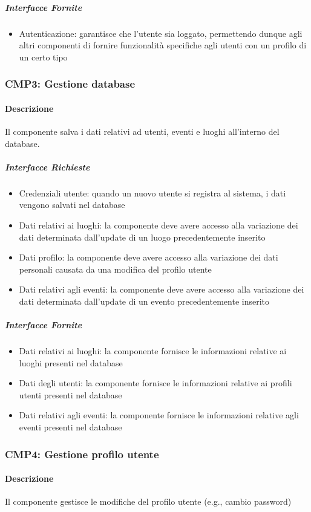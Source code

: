 \documentclass[9pt]{extarticle}
\begin{document}
\subparagraph{Interfacce Fornite}
\begin{itemize}
	\item Autenticazione: garantisce che l'utente sia loggato, permettendo dunque agli altri componenti di fornire funzionalità specifiche agli utenti con un profilo di un certo tipo
\end{itemize}

\subsubsection*{CMP3: Gestione database}
\paragraph{Descrizione}
Il componente salva i dati relativi ad utenti, eventi e luoghi all'interno del database.
\subparagraph{Interfacce Richieste}
\begin{itemize}
	\item Credenziali utente: quando un nuovo utente si registra al sistema, i dati vengono salvati nel database
	\item Dati relativi ai luoghi: la componente deve avere accesso alla variazione dei dati determinata dall'update di un luogo precedentemente inserito
	\item Dati profilo: la componente deve avere accesso alla variazione dei dati personali causata da una modifica del profilo utente
	\item Dati relativi agli eventi: la componente deve avere accesso alla variazione dei dati determinata dall'update di un evento precedentemente inserito
\end{itemize}
\subparagraph{Interfacce Fornite}
\begin{itemize}
	\item Dati relativi ai luoghi: la componente fornisce le informazioni relative ai luoghi presenti nel database
	\item Dati degli utenti: la componente fornisce le informazioni relative ai profili utenti presenti nel database
	\item Dati relativi agli eventi: la componente fornisce le informazioni relative agli eventi presenti nel database
\end{itemize}


\subsubsection*{CMP4: Gestione profilo utente}
\paragraph{Descrizione}
Il componente gestisce le modifiche del profilo utente (e.g., cambio password)
\end{document}
